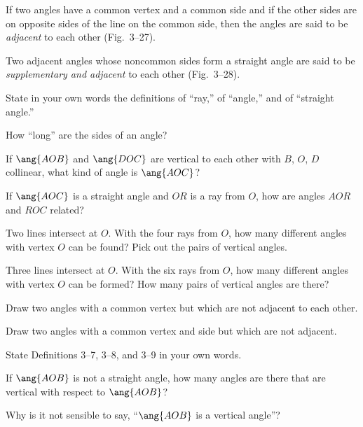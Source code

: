 \documentclass[11pt]{book}
\theoremstyle{bkplain}
\theoremstyle{XIplainnote}
\theoremstyle{bkplain}
\theoremstyle{bkplain}
\begin{document}
\FIGIIITWENTYSIX

\begin{definition}
If two angles have a common vertex and a common side and if the other sides are
on opposite sides of the line on the common side, then the angles are said to be
\emph{adjacent} to each other (Fig.~3--27).
\end{definition}

\FIGIIITWENTYSEVEN

\begin{definition}
Two adjacent angles whose noncommon sides form a straight angle are said to be
\emph{supplementary and adjacent} to each other (Fig.~3--28).
\end{definition}

\FIGIIITWENTYEIGHT

\begin{exercisecols}
\begin{exlist}
\item State in your own words the definitions of ``ray,'' of ``angle,'' and of
      ``straight angle.''
\item How ``long'' are the sides of an angle?
\item If $\ang{AOB}$ and $\ang{DOC}$ are vertical to each other with $B$, $O$,
      $D$ collinear, what kind of angle is $\ang{AOC}$?
\item If $\ang{AOC}$ is a straight angle and $OR$ is a ray from $O$, how are
      angles $AOR$ and $ROC$ related?
\item Two lines intersect at $O$. With the four rays from $O$, how many different
      angles with vertex $O$ can be found? Pick out the pairs of vertical angles.
\item Three lines intersect at $O$. With the six rays from $O$, how many
      different angles with vertex $O$ can be formed? How many pairs of vertical
      angles are there?
\item Draw two angles with a common vertex but which are not adjacent to each
      other.
\item Draw two angles with a common vertex and side but which are not adjacent.
\item State Definitions 3--7, 3--8, and 3--9 in your own words.
\item If $\ang{AOB}$ is not a straight angle, how many angles are there that are
      vertical with respect to $\ang{AOB}$?
\item Why is it not sensible to say, ``$\ang{AOB}$ is a vertical angle''?
\end{exlist}
\end{exercisecols}
\end{document}
